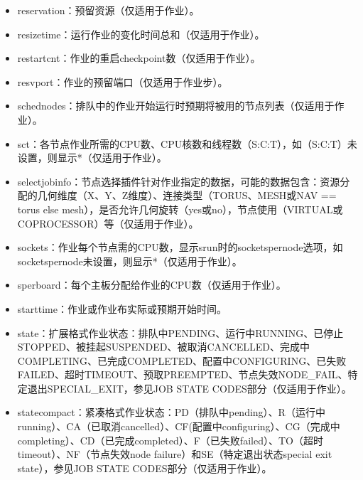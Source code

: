 \documentclass[a4paper,12pt,english]{sphinxmanual}
\begin{document}
\begin{itemize}
\begin{itemize}
\begin{itemize}
\item {} 
\sphinxAtStartPar
reservation：预留资源（仅适用于作业）。

\item {} 
\sphinxAtStartPar
resizetime：运行作业的变化时间总和（仅适用于作业）。

\item {} 
\sphinxAtStartPar
restartcnt：作业的重启checkpoint数（仅适用于作业）。

\item {} 
\sphinxAtStartPar
resvport：作业的预留端口（仅适用于作业步）。

\item {} 
\sphinxAtStartPar
schednodes：排队中的作业开始运行时预期将被用的节点列表（仅适用于作业）。

\item {} 
\sphinxAtStartPar
sct：各节点作业所需的CPU数、CPU核数和线程数（S:C:T），如（S:C:T）未设置，则显示*（仅适用于作业）。

\item {} 
\sphinxAtStartPar
selectjobinfo：节点选择插件针对作业指定的数据，可能的数据包含：资源分配的几何维度（X、Y、Z维度）、连接类型（TORUS、MESH或NAV == torus else mesh），是否允许几何旋转（yes或no），节点使用（VIRTUAL或COPROCESSOR）等（仅适用于作业）。

\item {} 
\sphinxAtStartPar
sockets：作业每个节点需的CPU数，显示srun时的\sphinxhyphen{}\sphinxhyphen{}sockets\sphinxhyphen{}per\sphinxhyphen{}node选项，如\sphinxhyphen{}\sphinxhyphen{}sockets\sphinxhyphen{}per\sphinxhyphen{}node未设置，则显示*（仅适用于作业）。

\item {} 
\sphinxAtStartPar
sperboard：每个主板分配给作业的CPU数（仅适用于作业）。

\item {} 
\sphinxAtStartPar
starttime：作业或作业布实际或预期开始时间。

\item {} 
\sphinxAtStartPar
state：扩展格式作业状态：排队中PENDING、运行中RUNNING、已停止STOPPED、被挂起SUSPENDED、被取消CANCELLED、完成中COMPLETING、已完成COMPLETED、配置中CONFIGURING、已失败FAILED、超时TIMEOUT、预取PREEMPTED、节点失效NODE\_FAIL、特定退出SPECIAL\_EXIT，参见JOB STATE CODES部分（仅适用于作业）。

\item {} 
\sphinxAtStartPar
statecompact：紧凑格式作业状态：PD（排队中pending）、R（运行中running）、CA（已取消cancelled）、CF(配置中configuring）、CG（完成中completing）、CD（已完成completed）、F（已失败failed）、TO（超时timeout）、NF（节点失效node failure）和SE（特定退出状态special exit state），参见JOB STATE CODES部分（仅适用于作业）。


\end{itemize}
\end{itemize}
\end{itemize}
\end{document}
